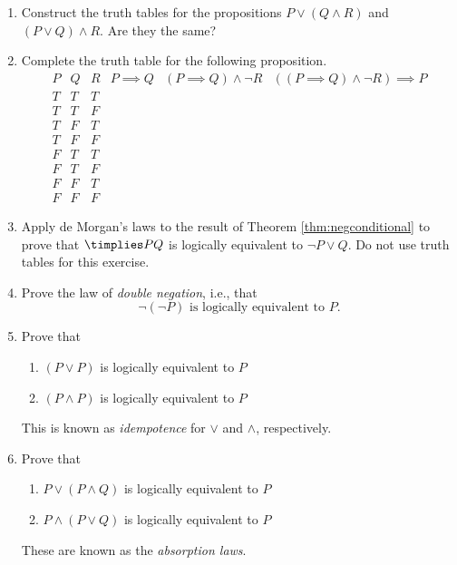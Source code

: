 \begin{enumerate}
  \item Construct the truth tables for the propositions $P\vee(Q\wedge R)$ and $(P\vee Q)\wedge R$. Are they the same?
  
  \item Complete the truth table for the following proposition.
  \[
  \begin{array}{ccc|c|c|c}
	P & Q & R & P\implies Q & (P\implies Q) \land \neg R & ((P\implies Q) \land \neg R)\implies P\\\hline
	T & T & T & \phantom{T} & \phantom{F} & \phantom{T}\\
	T & T & F & \phantom{T} & \phantom{T} & \phantom{T}\\
	T & F & T & \phantom{F} & \phantom{F} & \phantom{T}\\
	T & F & F & \phantom{F} & \phantom{F} & \phantom{T}\\
	F & T & T & \phantom{T} & \phantom{F} & \phantom{T}\\
	F & T & F & \phantom{T} & \phantom{T} & \phantom{F}\\
	F & F & T & \phantom{T} & \phantom{F} & \phantom{T}\\
	F & F & F & \phantom{T} & \phantom{T} & \phantom{F}
	\end{array}
	\]
  
  \item\label{ex:demorganimplies} Apply de Morgan's laws to the result of Theorem \ref{thm:negconditional}  to prove that $\timplies PQ$ is logically equivalent to $\neg P\vee Q$. Do not use truth tables for this exercise.
  
  \item Prove the law of \emph{double negation}, i.e., that
  \[
    \neg(\neg P) \text{ is logically equivalent to } P.
  \]
  
  \item Prove that 
  \begin{enumerate}
      \item $(P \lor P)$ is logically equivalent to $P$
      \item $(P \land P)$ is logically equivalent to $P$
  \end{enumerate} 
  This is known as \emph{idempotence} for $\lor$ and $\land$, respectively.
  
  \item Prove that 
  \begin{enumerate}
      \item $P \lor (P \land Q)$ is logically equivalent to $P$
      \item $P \land (P \lor Q)$ is logically equivalent to $P$
  \end{enumerate} 
  These are known as the \emph{absorption laws}.
  

\end{enumerate}
